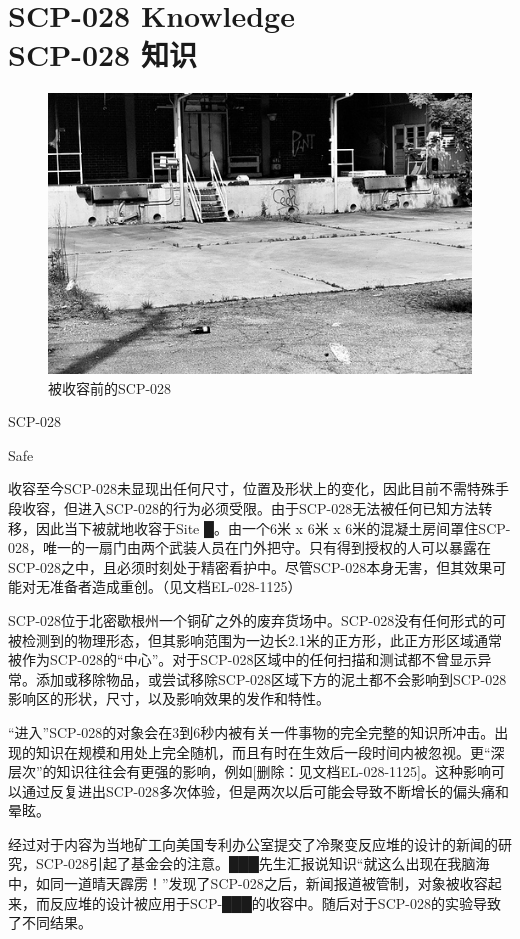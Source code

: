 \chapter[SCP-028 知识]{
    SCP-028 Knowledge\\
    SCP-028 知识
}

\label{chap:SCP-028}

\begin{figure}[H]
    \centering
    \includegraphics[width=0.5\linewidth]{images/SCP.028.jpg}
    \caption*{被收容前的SCP-028}
\end{figure}

SCP-028

Safe

收容至今SCP-028未显现出任何尺寸，位置及形状上的变化，因此目前不需特殊手段收容，但进入SCP-028的行为必须受限。由于SCP-028无法被任何已知方法转移，因此当下被就地收容于Site █。由一个6米 x 6米 x 6米的混凝土房间罩住SCP-028，唯一的一扇门由两个武装人员在门外把守。只有得到授权的人可以暴露在SCP-028之中，且必须时刻处于精密看护中。尽管SCP-028本身无害，但其效果可能对无准备者造成重创。（见文档EL-028-1125）

SCP-028位于北密歇根州一个铜矿之外的废弃货场中。SCP-028没有任何形式的可被检测到的物理形态，但其影响范围为一边长2.1米的正方形，此正方形区域通常被作为SCP-028的“中心”。对于SCP-028区域中的任何扫描和测试都不曾显示异常。添加或移除物品，或尝试移除SCP-028区域下方的泥土都不会影响到SCP-028影响区的形状，尺寸，以及影响效果的发作和特性。

“进入”SCP-028的对象会在3到6秒内被有关一件事物的完全完整的知识所冲击。出现的知识在规模和用处上完全随机，而且有时在生效后一段时间内被忽视。更“深层次”的知识往往会有更强的影响，例如[删除：见文档EL-028-1125]。这种影响可以通过反复进出SCP-028多次体验，但是两次以后可能会导致不断增长的偏头痛和晕眩。

经过对于内容为当地矿工向美国专利办公室提交了冷聚变反应堆的设计的新闻的研究，SCP-028引起了基金会的注意。███先生汇报说知识“就这么出现在我脑海中，如同一道晴天霹雳！”发现了SCP-028之后，新闻报道被管制，对象被收容起来，而反应堆的设计被应用于SCP-███的收容中。随后对于SCP-028的实验导致了不同结果。

